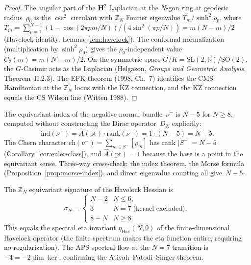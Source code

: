 \begin{proof}
The angular part of the $\mathbf{H}^2$ Laplacian at the
$N$-gon ring at geodesic radius~$\rho_0$ is the
$\csc^2$ circulant with $\mathbb{Z}_N$ Fourier eigenvalue
$T_m/\sinh^2\rho_0$, where
$T_m = \sum_{p=1}^{N-1}(1 - \cos(2\pi pm/N))
/(4\sin^2(\pi p/N)) = m(N{-}m)/2$
(Havelock identity, Lemma~\ref{lem:havelock}).
The conformal normalization (multiplication by
$\sinh^2\rho_0$) gives the $\rho_0$-independent value
$C_2(m) = m(N{-}m)/2$.
On the symmetric space $G/K = \mathrm{SL}(2,\mathbb{R})
/\mathrm{SO}(2)$, the $G$-Casimir acts as the Laplacian
(Helgason, \emph{Groups and Geometric Analysis},
Theorem~II.2.3).
The EFK theorem (1998, Ch.~7) identifies the
CMS Hamiltonian at the $\mathbb{Z}_N$ locus with the
KZ connection, and the KZ connection equals the CS
Wilson line (Witten 1988).
\end{proof}

\begin{corollary}
\label{cor:index-from-char}
The equivariant index of the negative normal bundle~$\nu^-$
is $N{-}5$ for $N \ge 8$, computed without constructing
the Dirac operator~$D_N$ explicitly:
\[
  \mathrm{ind}(\nu^-)
  = \hat{A}(\mathrm{pt}) \cdot \mathrm{rank}(\nu^-)
  = 1 \cdot (N{-}5) = N{-}5.
\]
The Chern character $\mathrm{ch}(\nu^-) = \sum_{m \in S^-}[\rho_m]$
has rank $|S^-| = N{-}5$
(Corollary~\ref{cor:euler-class}), and
$\hat{A}(\mathrm{pt}) = 1$ because the base is a point
in the equivariant sense.
Three-way cross-check: the index theorem, the Morse
formula (Proposition~\ref{prop:morse-index}), and direct
eigenvalue counting all give~$N{-}5$.
\end{corollary}

\begin{corollary}
\label{cor:equiv-sig}
The $\mathbb{Z}_N$ equivariant signature of the
Havelock Hessian is
\[
  \sigma_N =
  \begin{cases}
    N{-}2 & N \le 6, \\
    3 & N = 7 \;\text{(kernel excluded)}, \\
    8{-}N & N \ge 8.
  \end{cases}
\]
This equals the spectral eta invariant
$\eta_{\mathrm{Hav}}(N, 0)$ of the finite-dimensional
Havelock operator (the finite spectrum makes the
eta function entire, requiring no regularization).
The APS spectral flow at the $N = 7$ transition is
$-4 = -2\dim\ker$, confirming the
Atiyah--Patodi--Singer theorem.
\end{corollary}

